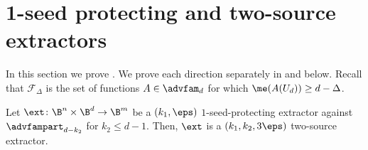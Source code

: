 \documentclass{toc}
\begin{document}
\section{1-seed protecting and two-source extractors}\label{sec:two source}

In this section we prove . We prove each direction separately in  and  below. Recall that $\mathcal{F}_{\Delta}$ is the set of functions $A \in \advfam_d$ for which $\me(A(U_d)) \ge d-\Delta$.

\begin{lemma}\label{lem: sp is ts}
Let  $\ext \colon \B^{n} \times \B^{d} \rightarrow \B^{m}$ be a $(k_1,\eps)$ $1$-seed-protecting extractor against $\advfampart_{d-k_2}$ for $k_2\leq d-1$. Then, $\ext$ is a $(k_1,k_2, 3\eps)$ two-source extractor.
\end{lemma}
%
\end{document}
